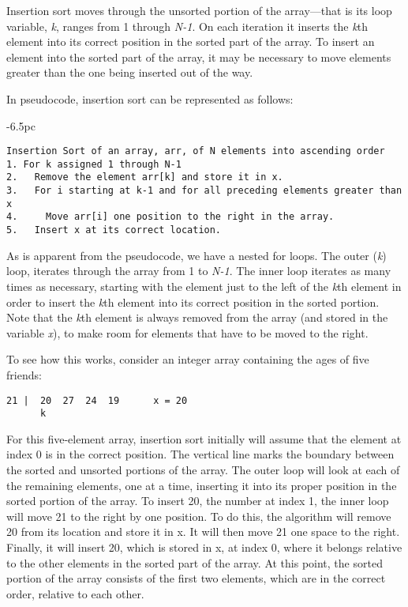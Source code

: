 Insertion sort moves through the unsorted portion of the
array---that is its loop variable, {\em k}, ranges from 1 through
{\em N-1}.  On each iteration it inserts the {\em k}th element into
its correct position in the sorted part of the array.  To insert an
element into the sorted part of the array, it may be necessary to move
elements greater than the one being inserted out of the way.

In pseudocode, insertion sort can be represented as follows:

\begin{jjjlistingleft}[32pc]{-6.5pc}
\begin{lstlisting}
Insertion Sort of an array, arr, of N elements into ascending order
1. For k assigned 1 through N-1
2.   Remove the element arr[k] and store it in x.
3.   For i starting at k-1 and for all preceding elements greater than x
4.     Move arr[i] one position to the right in the array.
5.   Insert x at its correct location.
\end{lstlisting}
\end{jjjlistingleft}

\noindent As is apparent from the pseudocode, we have a nested for
loops. The outer ({\em k}) loop, iterates through the array from 1 to
{\em N-1}. The inner loop iterates as many times as necessary,
starting with the element just to the left of the {\em k}th element
in order to insert the {\em k}th element into its correct position in
the sorted portion.  Note that the {\em k}th element is always removed
from the array (and stored in the variable {\em x}), to make room for
elements that have to be moved to the right.

To see how this works, consider an integer array containing the ages
of five friends:

\begin{jjjlisting}
\begin{lstlisting}
21 |  20  27  24  19      x = 20
      k 
\end{lstlisting}
\end{jjjlisting}

\noindent For this five-element array, insertion sort initially will
assume that the element at index 0 is in the correct position. The
vertical line marks the boundary between the sorted and unsorted
portions of the array.  The outer loop will look at each of the
remaining elements, one at a time, inserting it into its proper
position in the sorted portion of the array.  To insert 20, the number
at index 1, the inner loop will move 21 to the right by one
position. To do this, the algorithm will remove 20 from its location
and store it in x. It will then move 21 one space to the
right. Finally, it will insert 20, which is stored in x, at index 0,
where it belongs relative to the other elements in the sorted part of
the array.  At this point, the sorted portion of the array consists of
the first two elements, which are in the correct order, relative to
each other.

